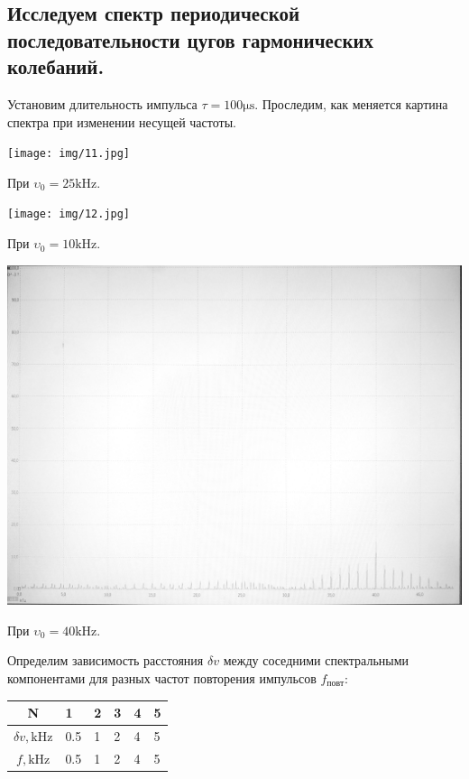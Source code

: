 \documentclass[12pt,a4paper]{article}
\begin{document}
    \subsection{Исследуем спектр периодической последовательности цугов гармонических колебаний.}
        Установим длительность импульса $\tau = 100 \si{\micro\second}$. Проследим, как меняется картина спектра при изменении несущей частоты.
        \begin{center}
            \texttt{[image: img/11.jpg]}

            При $\upsilon_0 = 25 \si{\kilo\hertz}$.
        
            \texttt{[image: img/12.jpg]}

            При $\upsilon_0 = 10 \si{\kilo\hertz}$.
        
            \includegraphics[width=0.85\linewidth]{img/13.jpg}

            При $\upsilon_0 = 40 \si{\kilo\hertz}$.
        \end{center}
        
        \newpage
        Определим зависимость расстояния $\delta v$ между соседними спектральными компонентами для разных частот повторения импульсов $f_{\text{повт}}$:
        
        \begin{center}
            \begin{tabular}{|c|l|l|l|l|l|}
                \hline
                N & 1&2&3&4&5  \\ \hline
                $\delta v, \si{\kilo\hertz}$ & 0.5 & 1& 2&4&5\\ \hline
                $f, \si{\kilo\hertz}$& 0.5 & 1&2&4&5 \\ \hline
            \end{tabular}
        \end{center}
        
\end{document}
